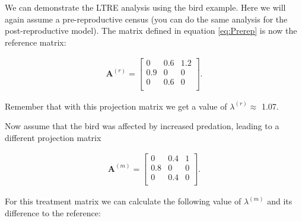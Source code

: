 \documentclass[
]{book}
\newenvironment{Shaded}{\begin{snugshade}}{\end{snugshade}}
\newcommand{\AttributeTok}[1]{\textcolor[rgb]{0.77,0.63,0.00}{#1}}
\newcommand{\CommentTok}[1]{\textcolor[rgb]{0.56,0.35,0.01}{\textit{#1}}}
\newcommand{\DecValTok}[1]{\textcolor[rgb]{0.00,0.00,0.81}{#1}}
\newcommand{\FunctionTok}[1]{\textcolor[rgb]{0.00,0.00,0.00}{#1}}
\newcommand{\NormalTok}[1]{#1}
\newcommand{\OtherTok}[1]{\textcolor[rgb]{0.56,0.35,0.01}{#1}}
\newcommand{\SpecialCharTok}[1]{\textcolor[rgb]{0.00,0.00,0.00}{#1}}
\begin{document}
We can demonstrate the LTRE analysis using the bird example. Here we will again assume a pre-reproductive census (you can do the same analysis for the post-reproductive model). The matrix defined in equation \eqref{eq:Prerep} is now the reference matrix:

\begin{align*}
\mathbf{A}^{(r)}=\left[\begin{matrix} 0 &0.6 &1.2  \\ 0.9 &0&0\\ 0 & 0.6 &0  \\  \end{matrix}\right].
\end{align*}

Remember that with this projection matrix we get a value of \(\lambda^{(r)}\approx\) 1.07.

Now assume that the bird was affected by increased predation, leading to a different projection matrix

\begin{align*}
\mathbf{A}^{(m)}=\left[\begin{matrix} 0 &0.4 &1   \\ 0.8 &0&0\\ 0 & 0.4 &0  \\  \end{matrix}\right].
\end{align*}

For this treatment matrix we can calculate the following value of \(\lambda^{(m)}\) and its difference to the reference:

\begin{Shaded}
\end{Shaded}
\end{document}
